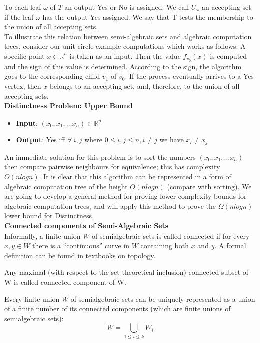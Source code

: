 To each leaf $\omega$ of $T$ an output Yes or No is assigned.
We call $U_\omega$ an accepting set if the leaf $\omega$ has the output Yes assigned.
We say that T tests the membership to the union of all accepting sets.\\

To illustrate this relation between
semi-algebraic sets and algebraic computation trees,
consider our unit circle example computations which works as follows.
A specific point $x \in \mathbb{R}^n$ is taken as an input.
Then the value $f_{v_0}(x)$ is computed and the sign of this value is determined.
According to the sign, the algorithm goes to the corresponding child $v_1$ of $v_0$.
If the process eventually arrives to a Yes-vertex, then $x$ belongs to an accepting set,
and, therefore, to the union of all accepting sets.\\

\textbf{Distinctness Problem: Upper Bound}
\begin{itemize}
    \item \textbf{Input}: $(x_0, x_1,\dots x_n) \in \mathbb{R}^n$
    \item \textbf{Output}: Yes iff $\forall\ i,j$ where $0 \leq i,j \leq n, i \neq j$ we have $x_i \neq x_j$
\end{itemize}
An immediate solution for this problem is to sort the numbers $(x_0, x_1,\dots x_n)$
then compare pairwise neighbours for equivalence;
this has complexity $O(nlogn)$.
It is clear that this algorithm can be represented in a form of algebraic computation tree
of the height $O(nlogn)$ (compare with sorting).
We are going to develop a general method for proving lower complexity bounds for algebraic computation trees,
and will apply this method to prove the $\Omega(nlogn)$ lower bound for Distinctness.\\

\textbf{Connected components of Semi-Algebraic Sets}\\
Informally,
a finite union $W$ of semialgebraic sets is called connected
if for every $x, y \in W$ there is a “continuous” curve in $W$ containing both $x$ and $y$.
A formal definition can be found in textbooks on topology.

\begin{definition}
    Any maximal (with respect to the set-theoretical inclusion) connected subset of W is called connected component of W.
\end{definition}

\begin{theorem}
    Every finite union $W$ of semialgebraic sets
    can be uniquely represented as a union of a finite number of its connected components
    (which are finite unions of semialgebraic sets):
    $$W = \bigcup\limits_{1\leq i \leq k} W_i$$
\end{theorem}

